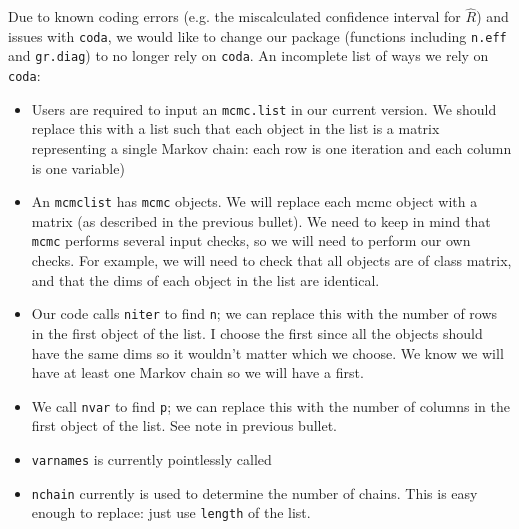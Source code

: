 \documentclass[12pt]{article}
\theoremstyle{remark}
\begin{document}
Due to known coding errors (e.g. the miscalculated confidence interval for $\hat{R}$) and issues with \texttt{coda}, we would like to change our package (functions including \texttt{n.eff} and \texttt{gr.diag}) to no longer rely on \texttt{coda}. An incomplete list of ways we rely on  \texttt{coda}: 

\begin{itemize}
 \renewcommand{\labelitemi}{$\blacksquare$}
\item Users are required to input an \texttt{mcmc.list} in our current version. We should replace this with a list such that each object in the list is a matrix representing a single Markov chain: each row is one iteration and each column is one variable)
\item An \texttt{mcmclist} has \texttt{mcmc} objects. We will replace each mcmc object with a matrix (as described in the previous bullet). We need to keep in mind that \texttt{mcmc} performs several input checks, so we will need to perform our own checks. For example, we will need to check that all objects are of class matrix, and that the dims of each object in the list are identical. 

\item Our code calls \texttt{niter} to find \texttt{n}; we can replace this with the number of rows in the first object of the list. I choose the first since all the objects should have the same dims so it wouldn't matter which we choose. We know we will have at least one Markov chain so we will have a first.
\item We call \texttt{nvar} to find \texttt{p}; we can replace this with the number of columns in the first object of the list. See note in previous bullet.
\item \texttt{varnames} is currently pointlessly called
\item \texttt{nchain} currently is used to determine the number of chains. This is easy enough to replace: just use \texttt{length} of the list.
\end{itemize}










\end{document}
